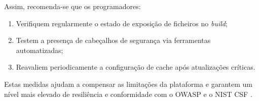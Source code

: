 Assim, recomenda-se que os programadores:

\begin{enumerate}

    \item Verifiquem regularmente o estado de exposição de ficheiros no \textit{build};

    \item Testem a presença de cabeçalhos de segurança via ferramentas automatizadas;

    \item Reavaliem periodicamente a configuração de cache após atualizações críticas.

\end{enumerate}

Estas medidas ajudam a compensar as limitações da plataforma e garantem um nível mais elevado de resiliência e conformidade com o OWASP e o NIST CSF \cite{ref2, ref18}.

